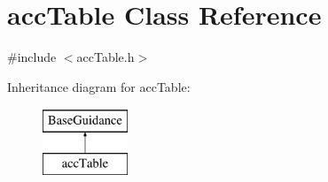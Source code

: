 \hypertarget{classacc_table}{}\section{acc\+Table Class Reference}
\label{classacc_table}


{\ttfamily \#include $<$acc\+Table.\+h$>$}

Inheritance diagram for acc\+Table\+:\begin{figure}[H]
\begin{center}
\leavevmode
\includegraphics[height=2.000000cm]{classacc_table}
\end{center}
\end{figure}
